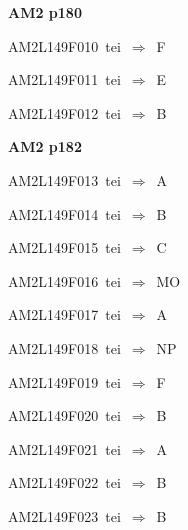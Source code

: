 \par\vfill\eject
{\bf\hfill AM2 p180\hfill\hbox{}}\par\bigskip
{\sixrm AM2L149F010\ {\sixit tei}\ }$\Rightarrow$\ F\par\smallskip
{\sixrm AM2L149F011\ {\sixit tei}\ }$\Rightarrow$\ E\par\smallskip
{\sixrm AM2L149F012\ {\sixit tei}\ }$\Rightarrow$\ B\par\smallskip

\par\vfill\eject
{\bf\hfill AM2 p182\hfill\hbox{}}\par\bigskip
{\sixrm AM2L149F013\ {\sixit tei}\ }$\Rightarrow$\ A\par\smallskip
{\sixrm AM2L149F014\ {\sixit tei}\ }$\Rightarrow$\ B\par\smallskip
{\sixrm AM2L149F015\ {\sixit tei}\ }$\Rightarrow$\ C\par\smallskip
{\sixrm AM2L149F016\ {\sixit tei}\ }$\Rightarrow$\ MO\par\smallskip
{\sixrm AM2L149F017\ {\sixit tei}\ }$\Rightarrow$\ A\par\smallskip
{\sixrm AM2L149F018\ {\sixit tei}\ }$\Rightarrow$\ NP\par\smallskip
{\sixrm AM2L149F019\ {\sixit tei}\ }$\Rightarrow$\ F\par\smallskip
{\sixrm AM2L149F020\ {\sixit tei}\ }$\Rightarrow$\ B\par\smallskip
{\sixrm AM2L149F021\ {\sixit tei}\ }$\Rightarrow$\ A\par\smallskip
{\sixrm AM2L149F022\ {\sixit tei}\ }$\Rightarrow$\ B\par\smallskip
{\sixrm AM2L149F023\ {\sixit tei}\ }$\Rightarrow$\ B\par\smallskip

